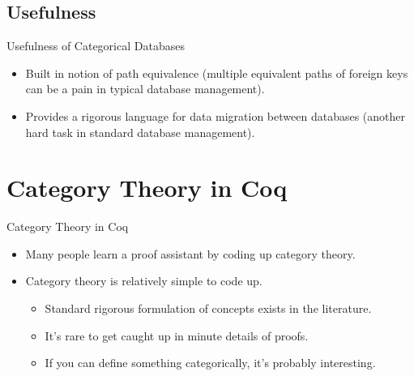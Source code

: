 \documentclass[utf8x]{beamer}
\begin{document}
  \subsection{Usefulness}
    \begin{frame}{Usefulness of Categorical Databases}
      \begin{itemize}
        \item
          Built in notion of path equivalence (multiple equivalent paths of foreign keys can be a pain in typical database management). \pause
        \item
          Provides a rigorous language for data migration between databases (another hard task in standard database management).
      \end{itemize}
    \end{frame}

\section{Category Theory in Coq}

  \begin{frame}{Category Theory in Coq}
    \begin{itemize}
      \item
        Many people learn a proof assistant by coding up category theory. \pause
      \item
        Category theory is relatively simple to code up. \pause
        \begin{itemize}
          \item
            Standard rigorous formulation of concepts exists in the literature. \pause
          \item
            It's rare to get caught up in minute details of proofs. \pause
          \item
            If you can define something categorically, it's probably interesting.
        \end{itemize}
    \end{itemize}
  \end{frame}
\end{document}
